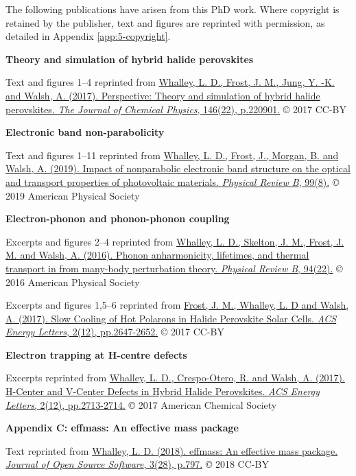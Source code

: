 
The following publications have arisen from this PhD work. Where copyright is retained by the publisher, text and figures are reprinted with permission, as detailed in Appendix \ref{app:5-copyright}.

\vspace{\frontmatterbaselineskip}

\textbf{Theory and simulation of hybrid halide perovskites } 

Text and figures 1--4 reprinted from
\href{https://doi.org/10.1063/1.4984964}{Whalley, L. D., Frost, J. M., Jung, Y. -K. and Walsh, A. (2017). Perspective: Theory and simulation of hybrid halide perovskites. \textit{The Journal of Chemical Physics}, 146(22), p.220901.} © 2017 CC-BY
\vspace{\frontmatterbaselineskip}

\textbf{Electronic band non-parabolicity}

Text and figures 1--11 reprinted from
\href{https://doi.org/10.1103/PhysRevB.99.085207}{Whalley, L. D., Frost, J., Morgan, B. and Walsh, A. (2019). Impact of nonparabolic electronic band structure on the optical and transport properties of photovoltaic materials. \textit{Physical Review B}, 99(8).} © 2019 American Physical Society
\vspace{\frontmatterbaselineskip}

\textbf{Electron-phonon and phonon-phonon coupling}

Excerpts and figures 2--4 reprinted from
\href{https://doi.org/10.1103/PhysRevB.94.220301}{Whalley, L. D., Skelton, J. M., Frost, J. M. and Walsh, A. (2016). Phonon anharmonicity, lifetimes, and thermal transport in  from many-body perturbation theory. \textit{Physical Review B}, 94(22).} © 2016 American Physical Society

Excerpts and figures 1,5--6 reprinted from
\href{https://doi.org/10.1021/acsenergylett.7b00862}{Frost, J. M., Whalley, L. D and Walsh, A. (2017). Slow Cooling of Hot Polarons in Halide Perovskite Solar Cells. \textit{ACS Energy Letters}, 2(12), pp.2647-2652.} © 2017 CC-BY
\vspace{\frontmatterbaselineskip}

\textbf{Electron trapping at H-centre defects}

Excerpts reprinted from
\href{https://doi.org/10.1021/acsenergylett.7b00995}{Whalley, L. D., Crespo-Otero, R. and Walsh, A. (2017). H-Center and V-Center Defects in Hybrid Halide Perovskites. \textit{ACS Energy Letters}, 2(12), pp.2713-2714.} © 2017 American Chemical Society 
\vspace{\frontmatterbaselineskip}

\textbf{Appendix C: effmass: An effective mass package}

Text reprinted from
\href{https://doi.org/10.21105/joss.00797}{Whalley, L. D. (2018). effmass: An effective mass package. \textit{Journal of Open Source Software}, 3(28), p.797.} © 2018 CC-BY 


